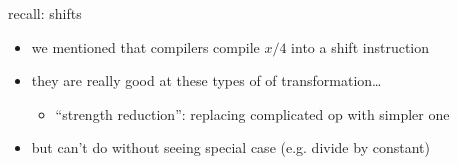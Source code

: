 \begin{frame}{recall: shifts}
    \begin{itemize}
    \item we mentioned that compilers compile $x/4$ into a shift instruction
    \item they are really good at these types of of transformation\ldots
        \begin{itemize}
        \item ``strength reduction'': replacing complicated op with simpler one
        \end{itemize}
    \vspace{.5cm}
    \item but can't do without seeing special case (e.g. divide by constant)
    \end{itemize}
\end{frame}
